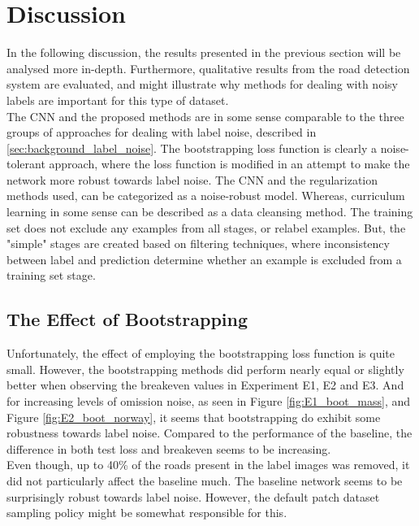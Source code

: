 \section{Discussion}
\label{sec:Discussion}
In the following discussion, the results presented in the previous section will be analysed more in-depth. Furthermore, qualitative results from the road detection system are evaluated, and might illustrate why methods for dealing with noisy labels are important for this type of dataset.\\

The \ac{CNN} and the proposed methods are in some sense comparable to the three groups of approaches for dealing with label noise, described in \ref{sec:background_label_noise}. The bootstrapping loss function is clearly a noise-tolerant approach, where the loss function is modified in an attempt to make the network more robust towards label noise. The \ac{CNN} and the regularization methods used, can be categorized as a noise-robust model. Whereas, curriculum learning in some sense can be described as a data cleansing method. The training set does not exclude any examples from all stages, or relabel examples. But, the "simple" stages are created based on filtering techniques, where inconsistency between label and prediction determine whether an example is excluded from a training set stage.  \\

\subsection{The Effect of Bootstrapping}
Unfortunately, the effect of employing the bootstrapping loss function is quite small. However, the bootstrapping methods did perform nearly equal or slightly better when observing the breakeven values in Experiment E1, E2 and E3. And for increasing levels of omission noise,  as seen in Figure \ref{fig:E1_boot_mass}, and Figure \ref{fig:E2_boot_norway}, it seems that bootstrapping do exhibit some robustness towards label noise. Compared to the performance of the baseline, the difference in both test loss and breakeven seems to be increasing.  \\

Even though, up to 40\% of the roads present in the label images was removed, it did not particularly affect the baseline much. The baseline network seems to be surprisingly robust towards label noise. However, the default patch dataset sampling policy might be somewhat responsible for this.\\

